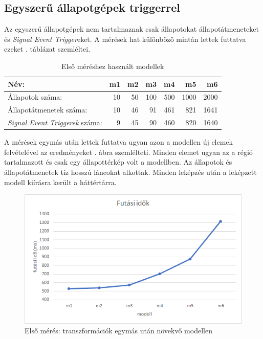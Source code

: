 \subsection{Egyszerű állapotgépek triggerrel}

Az egyszerű állapotgépek nem tartalmaznak csak állapotokat állapotátmeneteket és \emph{Signal Event Trigger}eket. A mérések hat különböző mintán lettek futtatva ezeket . táblázat szemléltei.

\begin{table}[H]
	\footnotesize
	\centering
	\begin{tabular}{ l r r r r r r}
		Név: & m1 & m2 & m3 & m4 & m5 & m6 \\ \hline
		Állapotok száma:  & 10 & 50 & 100 & 500 & 1000 & 2000 \\
		Állapotátmenetek száma: & 10 & 46 & 91 & 461 & 821 & 1641 \\
		\emph{Signal Event Triggerek} száma: & 9 & 45 & 90 & 460 & 820 & 1640
	\end{tabular}
	\caption{Első méréshez használt modellek}
	\label{table:meres1}
\end{table}

A mérések egymás után lettek futtatva ugyan azon a modellen új elemek felvételével az eredményeket . ábra szemlélteti. Minden elemet ugyan az a régió tartalmazott és csak egy állapottérkép volt a modellben. Az állapotok és állapotátmenetek tíz hosszú láncokat alkottak. Minden leképzés után a leképzett modell kiírásra került a háttértárra.

\begin{figure}[H]
	\centering
	\includegraphics[keepaspectratio, width=140mm]{figures/meres1.png}
	\caption{Első mérés: transzformációk egymás után növekvő modellen}
	\label{fig:meres1}
\end{figure}


